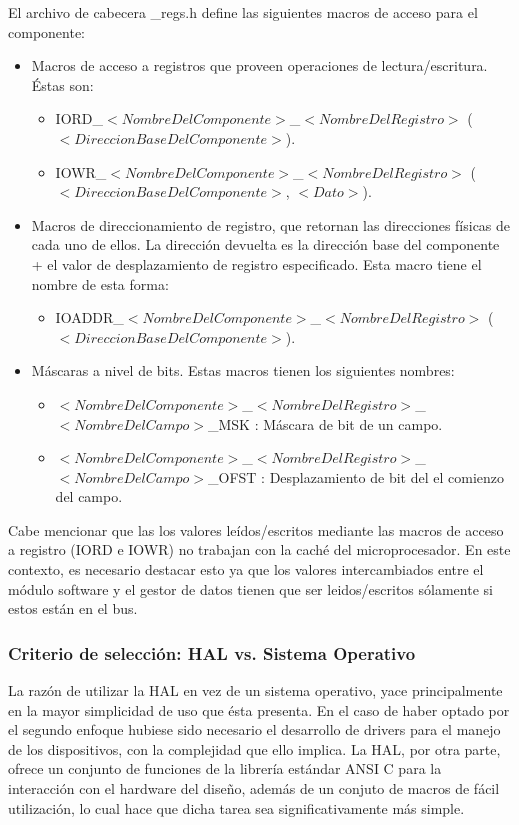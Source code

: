 El archivo de cabecera \_regs.h define las siguientes macros de acceso para el componente:
\begin{itemize}
	\item Macros de acceso a registros que proveen operaciones de lectura/escritura. Éstas son:
	\begin{itemize}
		\item IORD\_$<NombreDelComponente>$\_$<NombreDelRegistro>$ ($<DireccionBaseDelComponente>$).
		\item IOWR\_$<NombreDelComponente>$\_$<NombreDelRegistro>$ ($<DireccionBaseDelComponente>$, $<Dato>$).
	\end{itemize}
	\item Macros de direccionamiento de registro, que retornan las direcciones físicas de cada uno de ellos. La dirección devuelta es la dirección base del componente + el valor de desplazamiento de registro especificado. Esta macro tiene el nombre de esta forma:
	\begin{itemize}
		\item IOADDR\_$<NombreDelComponente>$\_$<NombreDelRegistro>$ ($<DireccionBaseDelComponente>$).
	\end{itemize}
	\item Máscaras a nivel de bits. Estas macros tienen los siguientes nombres:
	\begin{itemize}
		\item $<NombreDelComponente>$\_$<NombreDelRegistro>$\_$<NombreDelCampo>$\_MSK : Máscara de bit de un campo.
		\item $<NombreDelComponente>$\_$<NombreDelRegistro>$\_$<NombreDelCampo>$\_OFST : Desplazamiento de bit del el comienzo del campo.
	\end{itemize}
\end{itemize}

Cabe mencionar que las los valores leídos/escritos mediante las macros de acceso a registro (IORD e IOWR) no trabajan con la caché del microprocesador.
En este contexto, es necesario destacar esto ya que los valores intercambiados entre el módulo software y el gestor de datos tienen que ser leidos/escritos sólamente si estos están en el bus.

\subsubsection{Criterio de selección: HAL vs. Sistema Operativo}

La razón de utilizar la HAL en vez de un sistema operativo, yace principalmente en la mayor simplicidad de uso que ésta presenta. En el caso de haber optado por el segundo enfoque hubiese sido necesario el desarrollo de drivers para el manejo de los dispositivos, con la complejidad que ello implica. La HAL, por otra parte, ofrece un conjunto de funciones de la librería estándar ANSI C para la interacción con el hardware del diseño, además de un conjuto de macros de fácil utilización, lo cual hace que dicha tarea sea significativamente más simple.


